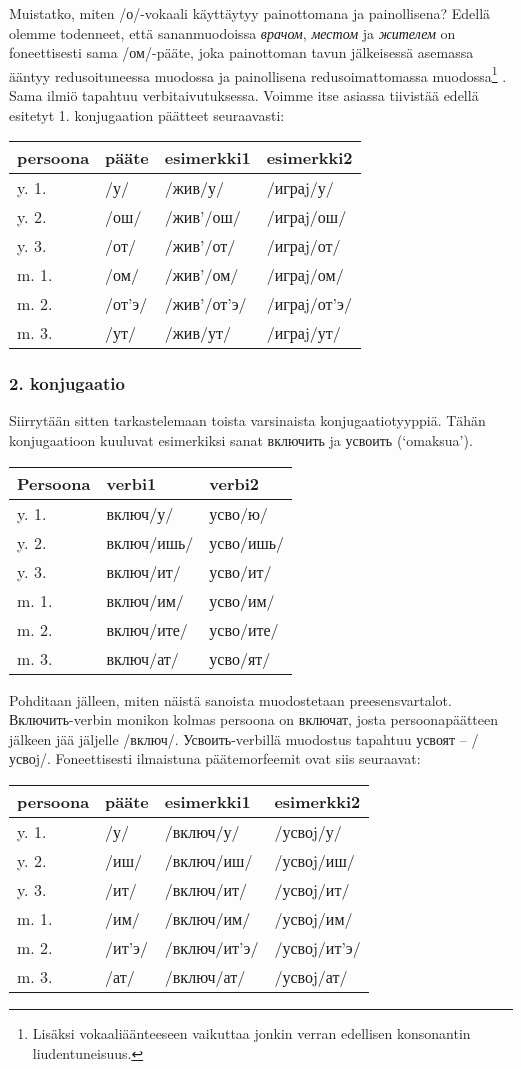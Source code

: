 \documentclass[]{scrartcl}
\begin{document}
Muistatko, miten /о/-vokaali käyttäytyy painottomana ja painollisena?
Edellä olemme todenneet, että sananmuodoissa \emph{врачом},
\emph{местом} ja \emph{жителем} on foneettisesti sama /ом/-pääte, joka
painottoman tavun jälkeisessä asemassa ääntyy redusoituneessa muodossa
ja painollisena redusoimattomassa muodossa\footnote{Lisäksi
  vokaaliäänteeseen vaikuttaa jonkin verran edellisen konsonantin
  liudentuneisuus.} . Sama ilmiö tapahtuu verbitaivutuksessa. Voimme
itse asiassa tiivistää edellä esitetyt 1. konjugaation päätteet
seuraavasti:

\begin{longtable}[c]{@{}llll@{}}
\toprule
persoona & pääte & esimerkki1 & esimerkki2\tabularnewline
\midrule
\endhead
y. 1. & /у/ & /жив/у/ & /играj/у/\tabularnewline
y. 2. & /ош/ & /жив'/ош/ & /играj/ош/\tabularnewline
y. 3. & /от/ & /жив'/от/ & /играj/от/\tabularnewline
m. 1. & /ом/ & /жив'/ом/ & /играj/ом/\tabularnewline
m. 2. & /от'э/ & /жив'/от'э/ & /играj/от'э/\tabularnewline
m. 3. & /ут/ & /жив/ут/ & /играj/ут/\tabularnewline
\bottomrule
\end{longtable}

\subsubsection{2. konjugaatio}\label{konjugaatio-1}

Siirrytään sitten tarkastelemaan toista varsinaista konjugaatiotyyppiä.
Tähän konjugaatioon kuuluvat esimerkiksi sanat включить ja усвоить
(`omaksua').

\begin{longtable}[c]{@{}lll@{}}
\toprule
Persoona & verbi1 & verbi2\tabularnewline
\midrule
\endhead
y. 1. & включ/у/ & усво/ю/\tabularnewline
y. 2. & включ/ишь/ & усво/ишь/\tabularnewline
y. 3. & включ/ит/ & усво/ит/\tabularnewline
m. 1. & включ/им/ & усво/им/\tabularnewline
m. 2. & включ/ите/ & усво/ите/\tabularnewline
m. 3. & включ/ат/ & усво/ят/\tabularnewline
\bottomrule
\end{longtable}

Pohditaan jälleen, miten näistä sanoista muodostetaan preesensvartalot.
Включить-verbin monikon kolmas persoona on включат, josta
persoonapäätteen jälkeen jää jäljelle /включ/. Усвоить-verbillä
muodostus tapahtuu усвоят -- /усвоj/. Foneettisesti ilmaistuna
päätemorfeemit ovat siis seuraavat:

\begin{longtable}[c]{@{}llll@{}}
\toprule
persoona & pääte & esimerkki1 & esimerkki2\tabularnewline
\midrule
\endhead
y. 1. & /у/ & /включ/у/ & /усвоj/у/\tabularnewline
y. 2. & /иш/ & /включ/иш/ & /усвоj/иш/\tabularnewline
y. 3. & /ит/ & /включ/ит/ & /усвоj/ит/\tabularnewline
m. 1. & /им/ & /включ/им/ & /усвоj/им/\tabularnewline
m. 2. & /ит'э/ & /включ/ит'э/ & /усвоj/ит'э/\tabularnewline
m. 3. & /ат/ & /включ/ат/ & /усвоj/ат/\tabularnewline
\bottomrule
\end{longtable}
\end{document}
